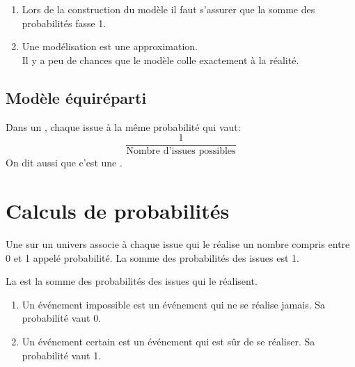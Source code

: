 \begin{remarque}
    \begin{enumerate}
        \item Lors de la construction du modèle il faut s'assurer que la somme
            des probabilités fasse 1.
        \item Une \og modélisation\fg{} est une approximation.\\ Il y a peu de chances que le modèle colle exactement à la réalité. 
    \end{enumerate}
\end{remarque}


\subsection{Modèle équiréparti}

\begin{definition}
 Dans un , chaque issue à la même probabilité qui vaut:
\[\dfrac{1}{\text{Nombre d'issues possibles}}\]
On dit aussi que c'est une .

\end{definition}


\section{Calculs de probabilités}

\begin{definition}
 Une  sur un univers associe à chaque issue qui le réalise un nombre compris entre 0 et 1 appelé probabilité. La somme des probabilités des issues est 1.
\end{definition}
\begin{definition}
 La  est la somme des probabilités des issues qui le réalisent.
\end{definition}
\begin{notation}
 \begin{enumerate}
  \item Un événement impossible est un événement qui ne se réalise jamais. Sa probabilité vaut 0.
  \item Un événement certain est un événement qui est sûr de se réaliser. Sa probabilité vaut 1.
 \end{enumerate}
\end{notation}

